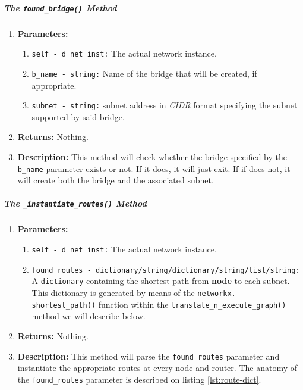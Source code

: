     \subparagraph{The \texttt{found\_bridge()} Method}
        \begin{enumerate}
            \item \textbf{Parameters:}
            \begin{enumerate}
                \item \texttt{self - d\_net\_inst:} The actual network instance.
                \item \texttt{b\_name - string:} Name of the bridge that will be created, if appropriate.
                \item \texttt{subnet - string:} subnet address in \textit{CIDR} format specifying the subnet supported by said bridge.
            \end{enumerate}
            \item \textbf{Returns:} Nothing.
            \item \textbf{Description:} This method will check whether the bridge specified by the \texttt{b\_name} parameter exists or not. If it does, it will just exit. If if does not, it will create both the bridge and the associated subnet.
        \end{enumerate}

    \subparagraph{The \texttt{\_instantiate\_routes()} Method}
        \begin{enumerate}
            \item \textbf{Parameters:}
            \begin{enumerate}
                \item \texttt{self - d\_net\_inst:} The actual network instance.
                \item \texttt{found\_routes - dictionary/string/dictionary/string/list/string:} A \texttt{dictionary} containing the shortest path from \textbf{node} to each subnet. This dictionary is generated by means of the \texttt{\allowbreak networkx. shortest\_path()} function within the \texttt{translate\_n\_execute\_graph()} method we will describe below.
            \end{enumerate}
            \item \textbf{Returns:} Nothing.
            \item \textbf{Description:} This method will parse the \texttt{found\_routes} parameter and instantiate the appropriate routes at every node and router. The anatomy of the \texttt{found\_routes} parameter is described on listing \ref{lst:route-dict}.
        \end{enumerate}

